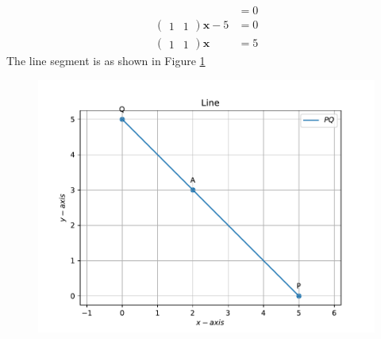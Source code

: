 \documentclass[12pt]{article}
\newcommand{\myvec}[1]{\ensuremath{\begin{pmatrix}#1\end{pmatrix}}}
\let\vec\mathbf
\begin{document}
\begin{enumerate}
\begin{align}
{{{			     }
		}}  &= 0  \\
	\myvec{ 1 & 1} \vec{x} -5 &= 0 \\
	\myvec{ 1 & 1} \vec{x}  &= 5 
\end{align}
The line segment is as shown in Figure \ref{fig:Fig1}
\begin{figure}[!h]
	\begin{center}
		\includegraphics[width=\columnwidth]{./figs/problem12.pdf}
	\end{center}
\caption{}
\label{fig:Fig1}
\end{figure}

\end{enumerate}
\end{document}
